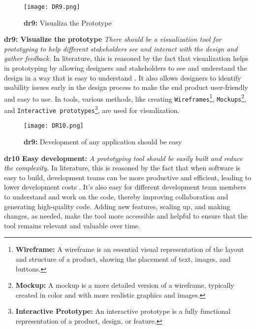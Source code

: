 \begin{figure}[htbp!]
  \centering    
  \texttt{[image: DR9.png]}
  \caption[Visualiza the Prototype]{\textbf{\ac{dr}9:} Visualiza the Prototype}
  \label{fig:design:dr9}
\end{figure}
\textbf{\ac{dr}9: Visualize the prototype} \textit{There should be a visualization tool for prototyping to help different stakeholders see and interact with the design and gather feedback.} 
In literature, this is reasoned by the fact that visualization helps in prototyping by allowing designers and stakeholders to see and understand the design in a way that is easy to understand \cite{article:comparative:prototypes}.
It also allows designers to identify usability issues \cite{article:prototyping:gould} early in the design process to make the end product user-friendly and easy to use.
In tools, various methods, like creating \texttt{Wireframes}\footnote{\textbf{Wireframe:} A wireframe is an essential visual representation of the layout and structure of a product, showing the placement of text, images, and buttons.}, \texttt{Mockups}\footnote{\textbf{Mockup:} A mockup is a more detailed version of a wireframe, typically created in color and with more realistic graphics and images.}, and \texttt{Interactive prototypes}\footnote{\textbf{Interactive Prototype:} An interactive prototype is a fully functional representation of a product, design, or feature.}, are used for visualization.

\begin{figure}[htbp!]
  \centering    
  \texttt{[image: DR10.png]}
  \caption[Easy development]{\textbf{\ac{dr}9:} Development of any application should be easy}
  \label{fig:design:d10}
\end{figure}
\textbf{\ac{dr}10 Easy development:} \textit{A prototyping tool should be easily built and reduce the complexity.} 
In literature, this is reasoned by the fact that when software is easy to build, development teams can be more productive and efficient, leading to lower development costs \cite{misc:lowcode:platforms}. 
It's also easy for different development team members to understand and work on the code, thereby improving collaboration \cite{misc:prorotypes:lauff} and generating high-quality code.
Adding new features, scaling up, and making changes, as needed, make the tool more accessible and helpful \cite{article:prototyping:lowcode} to ensure that the tool remains relevant and valuable over time.


